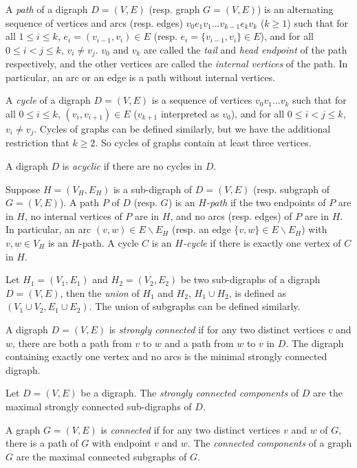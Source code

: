\documentclass{article}
\begin{document}
A \emph{path} of a digraph $D=(V,E)$ (resp. graph $G=(V,E)$) is an
alternating sequence of vertices and arcs (resp. edges)
$v_0e_1v_1...v_{k-1}e_kv_k$ ($k \ge 1$) such that for all $1 \le i
\le k$, $e_i=(v_{i-1}, v_i) \in E$ (resp. $e_i=\{v_{i-1},v_i\} \in
E$), and for all $0 \le i < j \le k$, $v_i \ne v_j$. $v_0$ and $v_k$
are called the \emph{tail} and \emph{head endpoint} of the path
respectively, and the other vertices are called the \emph{internal
vertices} of the path. In particular, an arc or an edge is a path
without internal vertices.

A \emph{cycle} of a digraph $D=(V,E)$ is a sequence of vertices
$v_0v_1...v_k$ such that for all $0 \le i \le k$, $(v_i, v_{i+1})
\in E$ ($v_{k+1}$ interpreted as $v_0$), and for all $0 \le i < j
\le k$, $v_i \ne v_j$. Cycles of graphs can be defined similarly,
but we have the additional restriction that $k \ge 2$. So cycles of
graphs contain at least three vertices.

A digraph $D$ is \emph{acyclic} if there are no cycles in $D$.

Suppose $H=(V_H,E_H)$ is a sub-digraph of $D=(V, E)$ (resp. subgraph
of $G=(V,E)$). A path $P$ of $D$ (resp. $G$) is an \emph{$H$-path}
if the two endpoints of $P$ are in $H$, no internal vertices of $P$
are in $H$, and no arcs (resp. edges) of $P$ are in $H$. In
particular, an arc $(v,w) \in E \backslash E_H$ (resp. an edge
$\{v,w\} \in E \backslash E_H$) with $v,w \in V_H$ is an $H$-path. A
cycle $C$ is an \emph{$H$-cycle} if there is exactly one vertex of
$C$ in $H$.

Let $H_1=(V_1,E_1)$ and $H_2=(V_2,E_2)$ be two sub-digraphs of a
digraph $D=(V,E)$, then the \emph{union} of $H_1$ and $H_2$, $H_1
\cup H_2$, is defined as $\left(V_1 \cup V_2, E_1 \cup E_2\right)$.
The union of subgraphs can be defined similarly.

A digraph $D=(V,E)$ is \emph{strongly connected} if for any two
distinct vertices $v$ and $w$, there are both a path from $v$ to $w$
and a path from $w$ to $v$ in $D$. The digraph containing exactly
one vertex and no arcs is the minimal strongly connected digraph.

Let $D=(V,E)$ be a digraph. The \emph{strongly connected components}
of $D$ are the maximal strongly connected sub-digraphs of $D$.

A graph $G=(V,E)$ is \emph{connected} if for any two distinct
vertices $v$ and $w$ of $G$, there is a path of $G$ with endpoint
$v$ and $w$. The \emph{connected components} of a graph $G$ are the
maximal connected subgraphs of $G$.
\end{document}
